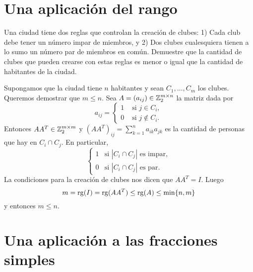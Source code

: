 \section{Una aplicación del rango}

\begin{problem}
    Una ciudad tiene dos reglas que controlan la creación de clubes: 1) Cada
    club debe tener un número impar de miembros, y 2) Dos clubes cualesquiera
    tienen a lo sumo un número par de miembros en común.  Demuestre que la
    cantidad de clubes que pueden crearse con estas reglas es menor o igual que
    la cantidad de habitantes de la ciudad.

    \begin{solution}
        Supongamos que la ciudad tiene $n$ habitantes y sean $C_1,\dots,C_m$
        los clubes. Queremos demostrar que $m\leq n$.  Sea
        $A=(a_{ij})\in\mathbb{Z}_2^{m\times n}$ la matriz dada por 
        \[
        a_{ij}=\begin{cases}
            1 & \text{ si $j\in C_i$},\\
            0 & \text{ si $j\not\in C_i$}.
        \end{cases}
        \]
        Entonces $AA^T\in\mathbb{Z}_2^{m\times m}$ y $(AA^T)_{ij}=\sum_{k=1}^n
        a_{ik}a_{jk}$ es la cantidad de personas que hay en $C_i\cap C_j$. En
        particular, 
        \[
            \begin{cases}
                1 & \text{si $|C_i\cap C_j|$ es impar},\\
                0 & \text{si $|C_i\cap C_j|$ es par}.
            \end{cases}
        \]
        La condiciones para la creación de clubes nos dicen que $AA^T=I$. Luego
        \[
        m=\operatorname{rg}(I)=\operatorname{rg}(AA^T)\leq\operatorname{rg}(A)\leq\min\{n,m\}
        \]
        y entonces $m\leq n$. 
    \end{solution}

    
\end{problem}

\section{Una aplicación a las fracciones simples}

